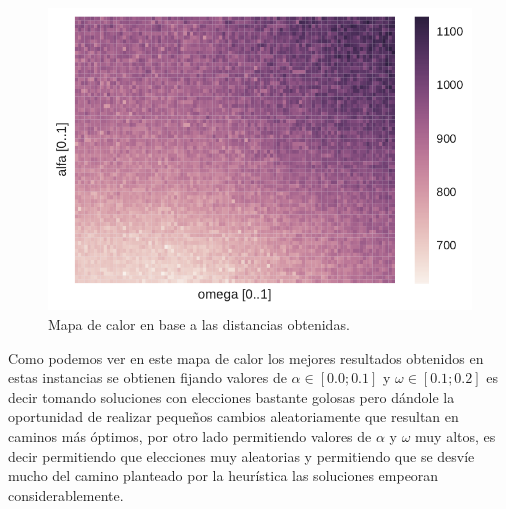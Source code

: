 \begin{figure}[H]
  \begin{center}
    \includegraphics{../experimentacion/ej4/experimento_1.pdf}
    \caption{Mapa de calor en base a las distancias obtenidas.}
    \label{fig:ej3_expAleat_cantCambios}
  \end{center}
\end{figure}

Como podemos ver en este mapa de calor los mejores resultados obtenidos en estas instancias se obtienen fijando valores de $\alpha \in [0.0 ; 0.1]$ y $\omega \in [0.1 ; 0.2]$ es decir tomando soluciones con elecciones bastante golosas pero dándole la oportunidad de realizar pequeños cambios aleatoriamente que resultan en caminos más óptimos, por otro lado permitiendo valores de $\alpha$ y $\omega$ muy altos, es decir permitiendo que elecciones muy aleatorias y permitiendo que se desvíe mucho del camino planteado por la heurística las soluciones empeoran considerablemente.
